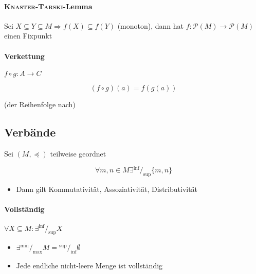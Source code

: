 \paragraph{\textsc{Knaster-Tarski}-Lemma}

Sei $X \subseteq Y \subseteq M \Rightarrow f(X) \subseteq f(Y)$ (monoton), dann hat $f: \mathcal{P}(M) \rightarrow \mathcal{P}(M)$ einen Fixpunkt

\paragraph{Verkettung} $f \circ g: A \rightarrow C$

$$(f \circ g) (a) = f(g(a))$$

(der Reihenfolge nach)


\subsection{Verbände}

Sei $(M, \preceq)$ teilweise geordnet

$$\forall m, n \in M \exists {}^{\inf}/_{\sup} \{m, n\}$$

\begin{itemize}
  \item Dann gilt Kommutativität, Assoziativität, Distributivität
\end{itemize}

\paragraph{Vollständig} $\forall X \subseteq M: \exists {}^{\inf}/_{\sup} X$

\begin{itemize}
  \item $\exists {}^{\min}/_{\max} M = {}^{\sup}/_{\inf} \emptyset$
  \item Jede endliche nicht-leere Menge ist vollständig
\end{itemize}

